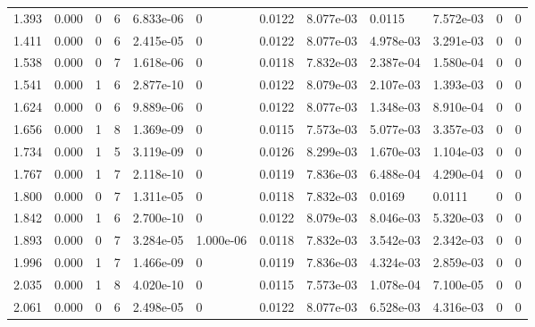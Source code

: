 \documentclass[preview]{standalone}
\begin{document}
{{\begin{tabular}{L{1.2cm}C{1.2cm} C{0.3cm}C{0.5cm} C{1.4cm}C{1.4cm} C{1.4cm}C{1.4cm} C{1.6cm}C{1.6cm} C{1.6cm}C{1.6cm}}
  1.393  &  0.000  & 0     &  6 &  6.833e-06  & 0  &  0.0122&   8.077e-03& 0.0115 & 7.572e-03   &  0 & 0  \\ 
  1.411  &  0.000  & 0     &  6 &  2.415e-05  & 0  &  0.0122&   8.077e-03& 4.978e-03 & 3.291e-03   &  0 & 0  \\ 
  1.538  &  0.000  & 0     &  7 &  1.618e-06  & 0  &  0.0118&   7.832e-03& 2.387e-04 & 1.580e-04   &  0 & 0  \\ 
  1.541  &  0.000  & 1     &  6 &  2.877e-10  & 0  &  0.0122&   8.079e-03& 2.107e-03 & 1.393e-03   &  0 & 0  \\ 
  1.624  &  0.000  & 0     &  6 &  9.889e-06  & 0  &  0.0122&   8.077e-03& 1.348e-03 & 8.910e-04   &  0 & 0  \\ 
  1.656  &  0.000  & 1     &  8 &  1.369e-09  & 0  &  0.0115&   7.573e-03& 5.077e-03 & 3.357e-03   &  0 & 0  \\ 
  1.734  &  0.000  & 1     &  5 &  3.119e-09  & 0  &  0.0126&   8.299e-03& 1.670e-03 & 1.104e-03   &  0 & 0  \\ 
  1.767  &  0.000  & 1     &  7 &  2.118e-10  & 0  &  0.0119&   7.836e-03& 6.488e-04 & 4.290e-04   &  0 & 0  \\ 
  1.800  &  0.000  & 0     &  7 &  1.311e-05  & 0  &  0.0118&   7.832e-03& 0.0169 & 0.0111   &  0 & 0  \\ 
  1.842  &  0.000  & 1     &  6 &  2.700e-10  & 0  &  0.0122&   8.079e-03& 8.046e-03 & 5.320e-03   &  0 & 0  \\ 
  1.893  &  0.000  & 0     &  7 &  3.284e-05  & 1.000e-06  &  0.0118&   7.832e-03& 3.542e-03 & 2.342e-03   &  0 & 0  \\ 
  1.996  &  0.000  & 1     &  7 &  1.466e-09  & 0  &  0.0119&   7.836e-03& 4.324e-03 & 2.859e-03   &  0 & 0  \\ 
  2.035  &  0.000  & 1     &  8 &  4.020e-10  & 0  &  0.0115&   7.573e-03& 1.078e-04 & 7.100e-05   &  0 & 0  \\ 
  2.061  &  0.000  & 0     &  6 &  2.498e-05  & 0  &  0.0122&   8.077e-03& 6.528e-03 & 4.316e-03   &  0 & 0  \\ 
\hline 
\end{tabular} 

}}
\end{document}

